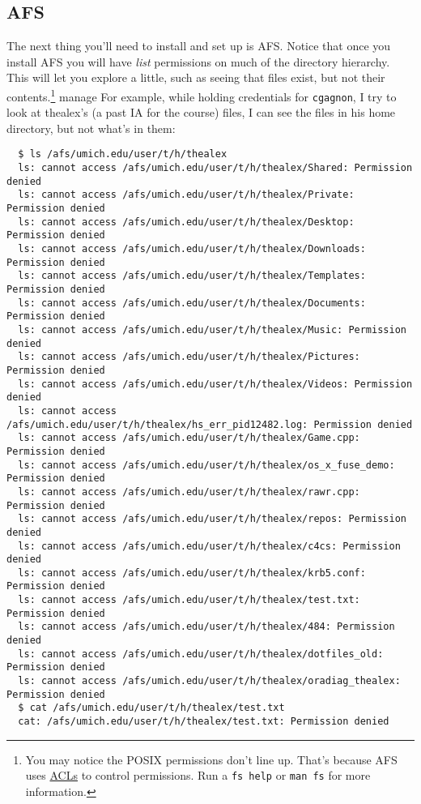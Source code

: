 \documentclass{article}
\begin{document}
\subsection*{AFS}

The next thing you'll need to install and set up is AFS.
Notice that once you install AFS you will have \emph{list} permissions on much
of the directory hierarchy. This will let you explore a little, such as seeing
that files exist, but not their contents.\footnote{You may notice the POSIX
permissions don't line up. That's because AFS uses
\href{https://web.njit.edu/info/afs.perms.html}{ACLs} to control permissions.
Run a \texttt{fs help} or \texttt{man fs} for more information. }
manage  For example, while holding credentials for \texttt{cgagnon}, I try to
look at thealex's (a past IA for the course) files, I can see the files in his
home directory, but not what's in them:

\begin{lstlisting}
  $ ls /afs/umich.edu/user/t/h/thealex
  ls: cannot access /afs/umich.edu/user/t/h/thealex/Shared: Permission denied
  ls: cannot access /afs/umich.edu/user/t/h/thealex/Private: Permission denied
  ls: cannot access /afs/umich.edu/user/t/h/thealex/Desktop: Permission denied
  ls: cannot access /afs/umich.edu/user/t/h/thealex/Downloads: Permission denied
  ls: cannot access /afs/umich.edu/user/t/h/thealex/Templates: Permission denied
  ls: cannot access /afs/umich.edu/user/t/h/thealex/Documents: Permission denied
  ls: cannot access /afs/umich.edu/user/t/h/thealex/Music: Permission denied
  ls: cannot access /afs/umich.edu/user/t/h/thealex/Pictures: Permission denied
  ls: cannot access /afs/umich.edu/user/t/h/thealex/Videos: Permission denied
  ls: cannot access /afs/umich.edu/user/t/h/thealex/hs_err_pid12482.log: Permission denied
  ls: cannot access /afs/umich.edu/user/t/h/thealex/Game.cpp: Permission denied
  ls: cannot access /afs/umich.edu/user/t/h/thealex/os_x_fuse_demo: Permission denied
  ls: cannot access /afs/umich.edu/user/t/h/thealex/rawr.cpp: Permission denied
  ls: cannot access /afs/umich.edu/user/t/h/thealex/repos: Permission denied
  ls: cannot access /afs/umich.edu/user/t/h/thealex/c4cs: Permission denied
  ls: cannot access /afs/umich.edu/user/t/h/thealex/krb5.conf: Permission denied
  ls: cannot access /afs/umich.edu/user/t/h/thealex/test.txt: Permission denied
  ls: cannot access /afs/umich.edu/user/t/h/thealex/484: Permission denied
  ls: cannot access /afs/umich.edu/user/t/h/thealex/dotfiles_old: Permission denied
  ls: cannot access /afs/umich.edu/user/t/h/thealex/oradiag_thealex: Permission denied
  $ cat /afs/umich.edu/user/t/h/thealex/test.txt
  cat: /afs/umich.edu/user/t/h/thealex/test.txt: Permission denied
\end{lstlisting}
\end{document}

